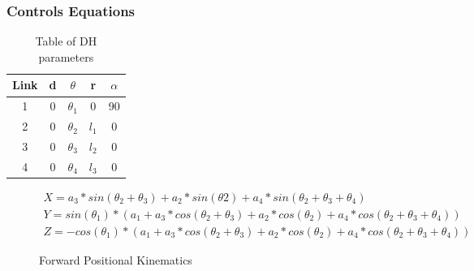 
        
        \subsubsection{Controls Equations}
        \begin{table}[H]
            \centering
            \begin{tabular}{|c|c|c|c|c|}
            \hline
                Link & d & $\theta$ & r & $\alpha$\\
                \hline
                1 & 0 & $\theta_1$ & 0 & 90 \\
                2 & 0 &$\theta_2$ & $l_1$ & 0  \\
                3 & 0 &$\theta_3$ & $l_2$ & 0 \\
                4 & 0 &$\theta_4$ & $l_3$ & 0  \\
                \hline
                \end{tabular}
            \caption{Table of DH parameters}
            \label{tab:DHTable}
        \end{table}
        
        \begin{figure}[H]
        \centering
        \begin{gather*}
        X = a_3*sin(\theta_2+\theta_3)+a_2*sin(\theta2)+a_4*sin(\theta_2+\theta_3+\theta_4)\\
        Y = sin(\theta_1)*(a_1+a_3*cos(\theta_2+\theta_3)+a_2*cos(\theta_2)+a_4*cos(\theta_2+\theta_3+\theta_4))\\
        Z = -cos(\theta_1)*(a_1+a_3*cos(\theta_2+\theta_3)+a_2*cos(\theta_2)+a_4*cos(\theta_2+\theta_3+\theta_4))
        \end{gather*}
        
        \caption{Forward Positional Kinematics}
        \label{fig:FWKin_Robot}
        \end{figure}
        
